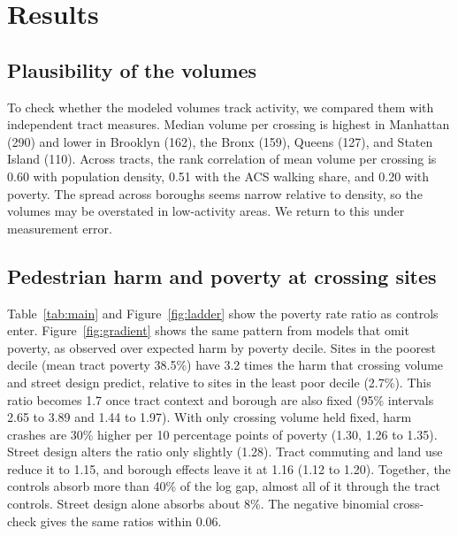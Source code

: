 \documentclass[10pt,twocolumn]{article}
\begin{document}
\section{Results}
\subsection{Plausibility of the volumes}
To check whether the modeled volumes track activity, we compared them with independent tract measures. Median volume per crossing is highest in Manhattan (290) and lower in Brooklyn (162), the Bronx (159), Queens (127), and Staten Island (110). Across tracts, the rank correlation of mean volume per crossing is 0.60 with population density, 0.51 with the ACS walking share, and 0.20 with poverty. The spread across boroughs seems narrow relative to density, so the volumes may be overstated in low-activity areas. We return to this under measurement error.

\subsection{Pedestrian harm and poverty at crossing sites}
Table~\ref{tab:main} and Figure~\ref{fig:ladder} show the poverty rate ratio as controls enter. Figure~\ref{fig:gradient} shows the same pattern from models that omit poverty, as observed over expected harm by poverty decile. Sites in the poorest decile (mean tract poverty 38.5\%) have 3.2 times the harm that crossing volume and street design predict, relative to sites in the least poor decile (2.7\%). This ratio becomes 1.7 once tract context and borough are also fixed (95\% intervals 2.65 to 3.89 and 1.44 to 1.97). With only crossing volume held fixed, harm crashes are 30\% higher per 10 percentage points of poverty (1.30, 1.26 to 1.35). Street design alters the ratio only slightly (1.28). Tract commuting and land use reduce it to 1.15, and borough effects leave it at 1.16 (1.12 to 1.20). Together, the controls absorb more than 40\% of the log gap, almost all of it through the tract controls. Street design alone absorbs about 8\%. The negative binomial cross-check gives the same ratios within 0.06.

\begin{table}[t]
\centering
\caption{Poverty rate ratio per 10 percentage point increase in tract poverty, with 95\% confidence intervals. Poisson regression with standard errors clustered by ZIP area. Harm crashes: 38,477 sites, 30,866 crashes. Deaths: 411 deaths.}
\label{tab:main}
\small

\end{table}
\end{document}
